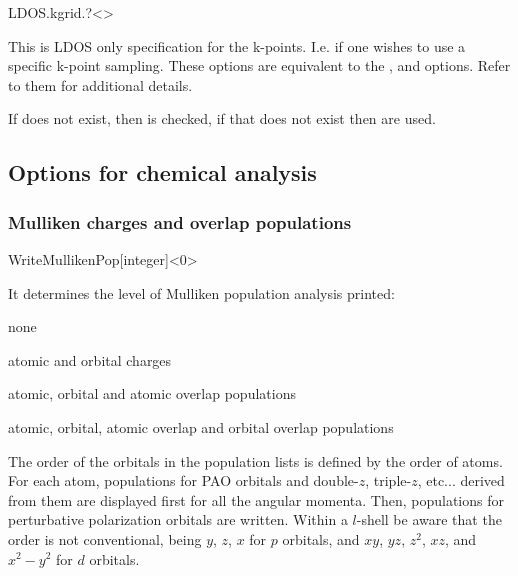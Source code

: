 \begin{fdfentry}{LDOS.kgrid.?}<>

  This is LDOS only specification for the k-points. I.e. if one wishes
  to use a specific k-point sampling. These options are equivalent to
  the ,  and
   options. Refer to them for additional details.

  If  does not exist, then  is
  checked, if that does not exist then  are used.

\end{fdfentry}



\subsection{Options for chemical analysis}

\subsubsection{Mulliken charges and overlap populations}

\begin{fdfentry}{WriteMullikenPop}[integer]<0>
  
  It determines the level of Mulliken population analysis printed:
  \begin{fdfoptions}
    \option[0]%
    none

    \option[1]%
    atomic and orbital charges

    \option[2]%
    atomic, orbital and atomic overlap populations

    \option[3]%
    atomic, orbital, atomic overlap and orbital overlap populations
    
  \end{fdfoptions}
  The order of the orbitals in the population lists is defined by the
  order of atoms. For each atom, populations for PAO orbitals and
  double-$z$, triple-$z$, etc... derived from them are displayed first
  for all the angular momenta. Then, populations for perturbative
  polarization orbitals are written.  Within a $l$-shell be aware that
  the order is not conventional, being $y$, $z$, $x$ for $p$ orbitals,
  and $xy$, $yz$, $z^2$, $xz$, and $x^2-y^2$ for $d$ orbitals.

\end{fdfentry}


